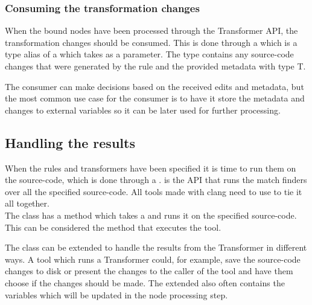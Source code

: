 \subsubsection*{Consuming the transformation changes} \label{subsubsec:080dev:Consumers}

When the bound nodes have been processed through the Transformer API, the transformation changes should be consumed. This is done through a  which is a type alias of a  which takes  as a parameter. The  type contains any source-code changes that were generated by the rule and the provided metadata with type T.

The consumer can make decisions based on the received edits and metadata, but the most common use case for the consumer is to have it store the metadata and changes to external variables so it can be later used for further processing.

\subsection{Handling the results} \label{subsec:080dev:HandlingToolResults}
When the rules and transformers have been specified it is time to run them on the source-code, which is done through a .  is the API that runs the match finders over all the specified source-code.
All tools made with clang need to use  to tie it all together.\\
The  class has a  method which takes a  and runs it on the specified source-code.
This can be considered the method that executes the tool.

The  class can be extended to handle the results from the Transformer in different ways. A tool which runs a Transformer could, for example, save the source-code changes to disk or present the changes to the caller of the tool and have them choose if the changes should be made. The extended  also often contains the variables which will be updated in the node processing step.